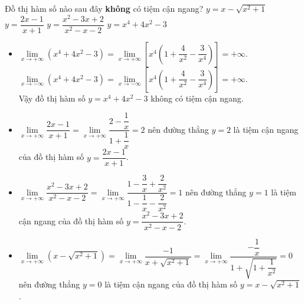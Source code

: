 \begin{ex}%
	Đồ thị hàm số nào sau đây \textbf{không} có tiệm cận ngang?
	\choice
	{$y=x-\sqrt{x^2+1}$}
	{$y=\dfrac{2x-1}{x+1}$}
	{$y=\dfrac{x^2-3x+2}{x^2-x-2}$}
	{\True $y=x^4+4x^2-3$}
	\loigiai
	{
		\begin{itemize}
			\item $\lim\limits_{x\to +\infty}\left(x^4+4x^2-3\right) = \lim\limits_{x\to +\infty}\left[x^4\left(1+\dfrac{4}{x^2}-\dfrac{3}{x^4}\right)\right] = +\infty$.\\
			$\lim\limits_{x\to -\infty}\left(x^4+4x^2-3\right) =\lim\limits_{x\to -\infty}\left[x^4\left(1+\dfrac{4}{x^2}-\dfrac{3}{x^4}\right)\right] = +\infty$.\\
			Vậy đồ thị hàm số $y=x^4+4x^2-3$ không có tiệm cận ngang.
			\item $\lim\limits_{x\to +\infty}\dfrac{2x-1}{x+1} = \lim\limits_{x\to +\infty}\dfrac{2-\dfrac{1}{x}}{1+\dfrac{1}{x}} = 2$ nên đường thẳng $y=2$ là tiệm cận ngang của đồ thị hàm số $y=\dfrac{2x-1}{x+1}$.
			\item $\lim\limits_{x\to +\infty}\dfrac{x^2-3x+2}{x^2-x-2} = \lim\limits_{x\to +\infty}\dfrac{1-\dfrac{3}{x}+\dfrac{2}{x^2}}{1-\dfrac{1}{x}-\dfrac{2}{x^2}}=1$ nên đường thẳng $y=1$ là tiệm cận ngang của đồ thị hàm số $y=\dfrac{x^2-3x+2}{x^2-x-2}$.
			\item $\lim\limits_{x\to +\infty}\left(x-\sqrt{x^2+1}\right) = \lim\limits_{x\to +\infty}\dfrac{-1}{x+\sqrt{x^2+1}} = \lim\limits_{x\to +\infty}\dfrac{-\dfrac{1}{x}}{1+\sqrt{1+\dfrac{1}{x^2}}} = 0$ nên đường thẳng $y=0$ là tiệm cận ngang của đồ thị hàm số $y=x-\sqrt{x^2+1}$.
		\end{itemize}
	}
\end{ex}

